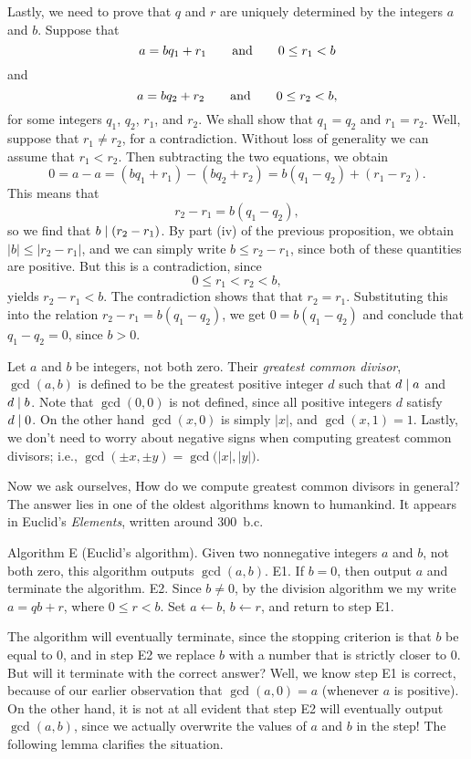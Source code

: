 \endgroup%
Lastly, we need to prove that $q$ and $r$ are uniquely determined by the integers $a$ and
$b$. Suppose that
$$a = bq_1 + r_1\qquad\hbox{and}\qquad 0\le r_1 < b$$
and
$$a = bq_2 + r_2\qquad\hbox{and}\qquad 0\le r_2 < b,$$
for some integers $q_1$, $q_2$, $r_1$, and $r_2$. We shall show that $q_1 = q_2$
and $r_1 = r_2$. Well, suppose that $r_1\ne r_2$, for a contradiction. Without loss
of generality we can assume that $r_1 < r_2$. Then subtracting the two equations, we obtain
$$ 0 = a-a = (bq_1 + r_1) - (bq_2 + r_2) = b(q_1-q_2) + (r_1 - r_2).$$
This means that
$$r_2 - r_1 = b(q_1 - q_2),$$
so we find that $b\mid (r_2 - r_1)$. By part (iv) of the previous proposition,
we obtain $|b| \le |r_2-r_1|$, and we can simply write $b \le r_2 -r_1$, since both of
these quantities are positive. But this is a contradiction, since
$$ 0\le r_1 < r_2 < b,$$
yields $r_2 - r_1 < b$. The contradiction shows that that $r_2 = r_1$. Substituting this
into the relation $r_2 - r_1 = b(q_1 - q_2)$, we get $0 = b(q_1 - q_2)$ and conclude that
$q_1 - q_2 = 0$, since $b>0$.\slug

Let $a$ and $b$ be integers, not both zero. Their {\it greatest common divisor}, $\gcd(a,b)$
is defined to be the greatest positive integer $d$ such that $d\mid a$ and $d\mid b$.
Note that $\gcd(0,0)$ is not defined, since all positive integers $d$ satisfy $d\mid 0$.
On the other hand $\gcd(x,0)$ is simply $|x|$, and $\gcd(x,1) = 1$. Lastly, we don't
need to worry about negative signs when computing greatest common divisors; i.e.,
$\gcd(\pm x, \pm y) = \gcd\bigl(|x|, |y|\bigr)$.

Now we ask ourselves, How do we compute greatest common divisors in general? The answer
lies in one of the oldest algorithms known to humankind. It appears in Euclid's {\sl Elements},
written around 300~{\sc b.c.}

\algbegin Algorithm E (Euclid's algorithm). Given two nonnegative integers $a$ and $b$, not both zero,
this algorithm outputs $\gcd(a,b)$.
\algstep E1. If $b=0$, then output $a$ and terminate the algorithm.
\algstep E2. Since $b\ne 0$, by the division algorithm we my write $a = qb+r$, where $0\le r < b$.
Set $a\gets b$, $b\gets r$, and return to step E1.\slug

The algorithm will eventually terminate, since the stopping criterion is that $b$ be equal to $0$,
and in step E2 we replace $b$ with a number that is strictly closer to $0$. But will it terminate
with the correct answer? Well, we know step E1 is correct,
because of our earlier observation that $\gcd(a,0) = a$ (whenever $a$
is positive). On the other hand, it is not at all evident that step E2 will eventually output
$\gcd(a,b)$, since we actually overwrite the values of $a$ and $b$ in the step! The following lemma
clarifies the situation.

